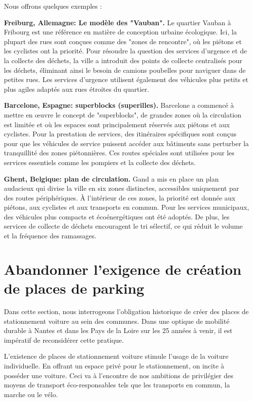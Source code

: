 Nous offrons quelques exemples :

\textbf{Freiburg, Allemagne: Le modèle des "Vauban".}
Le quartier Vauban à Fribourg est une référence en matière de
conception urbaine écologique. Ici, la plupart des rues sont conçues
comme des "zones de rencontre", où les piétons et les cyclistes ont la
priorité. Pour résoudre la question des services d'urgence et de la
collecte des déchets, la ville a introduit des points de collecte
centralisés pour les déchets, éliminant ainsi le besoin de camions
poubelles pour naviguer dans de petites rues. Les services d'urgence
utilisent également des véhicules plus petits et plus agiles adaptés
aux rues étroites du quartier.

\textbf{Barcelone, Espagne: superblocks (superilles).}
Barcelone a commencé à mettre en œuvre le concept de "superblocks", de
grandes zones où la circulation est limitée et où les espaces sont
principalement réservés aux piétons et aux cyclistes. Pour la
prestation de services, des itinéraires spécifiques sont conçus pour
que les véhicules de service puissent accéder aux bâtiments sans
perturber la tranquillité des zones piétonnières. Ces routes spéciales
sont utilisées pour les services essentiels comme les pompiers et la
collecte des déchets.

\textbf{Ghent, Belgique: plan de circulation.}
Gand a mis en place un plan audacieux qui divise la ville en six zones
distinctes, accessibles uniquement par des routes périphériques. À
l'intérieur de ces zones, la priorité est donnée aux piétons, aux
cyclistes et aux transports en commun. Pour les services municipaux,
des véhicules plus compacts et écoénergétiques ont été adoptés. De
plus, les services de collecte de déchets encouragent le tri sélectif,
ce qui réduit le volume et la fréquence des ramassages.


\section{Abandonner l'exigence de création de places de parking}

Dans cette section, nous interrogeons l'obligation historique de créer
des places de stationnement voiture au sein des communes. Dans une
optique de mobilité durable à Nantes et dans les Pays de la Loire sur
les 25 années à venir, il est impératif de reconsidérer cette
pratique.

L'existence de places de stationnement voiture stimule l'usage de la
voiture individuelle. En offrant un espace privé pour le
stationnement, on incite à posséder une voiture. Ceci va à l'encontre
de nos ambitions de privilégier des moyens de transport
éco-responsables tels que les transports en commun, la marche ou le
vélo.

